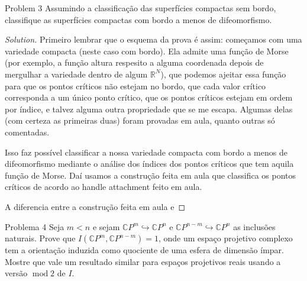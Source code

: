 \iffalse\begin{proof}[Solution]\leavevmode
	Considere a carta \(\varphi_0:\{z_0=1\}\subset\mathbb{C}P^{1}\to \mathbb{C}\), \([1:z]\mapsto z\). Obtemos
\begin{align*}
\frac{\partial }{\partial z}(f \circ \varphi_0^{-1})&=\frac{(1+|z|^2)^m \frac{\partial |1+z^m|^2}{\partial z}-m(1+|z|^2)^{m-1}\cdot \bar{z}\cdot |1+z^m|^2}{(1+|z|^2)^{2m}}.
\end{align*}
Calculamos com calma
\[\frac{\partial |1+z^m|^2}{\partial z}=\frac{\partial }{\partial z}(1+z^m)\overline{(1+z^m)}=(1+z^m)\cdot 0+mz^{m-1}\overline{(1+z^m)}\]
E sustituimos:
\begin{align*}
\frac{\partial }{\partial z}(f \circ \varphi_0^{-1})&=\frac{(1+|z|^2)^m \cdot mz^{m-1}\overline{(1+z^m)}-m(1+|z|^2)^{m-1}\cdot \bar{z}\cdot |1+z^m|^2}{(1+|z|^2)^{2m}}.
\end{align*}
\end{proof}\fi

\begin{thing1}{Problem 3}\label{prob:3}\leavevmode
Assumindo a classificação das superfícies compactas sem bordo, classifique as superfícies compactas com bordo a menos de difeomorfismo.
\end{thing1}

\begin{proof}[Solution]\leavevmode
Primeiro lembrar que o esquema da prova é assim: começamos com uma variedade compacta (neste caso com bordo). Ela admite uma função de Morse (por exemplo, a função altura respesito a alguma coordenada depois de mergulhar a variedade dentro de algum \(\mathbb{R}^N\)), que podemos ajeitar essa função para que os pontos críticos não estejam no bordo, que cada valor crítico corresponda a um único ponto crítico, que os pontos críticos estejam em ordem por índice, e talvez alguma outra propriedade que se me escapa. Algumas delas (com certeza as primeiras duas) foram provadas em aula, quanto outras só comentadas.

Isso faz possível classificar a nossa variedade compacta com bordo a menos de difeomorfismo mediante o análise dos índices dos pontos críticos que tem aquila função de Morse. Daí usamos a construção feita em aula que classifica os pontos críticos de acordo ao handle attachment feito em aula.

A diferencia entre a construção feita em aula e 
\end{proof}

\begin{thing1}{Problema 4}\label{prob:a 4}\leavevmode
Seja \(m<n\) e sejam \(\mathbb{C}P^{m}\hookrightarrow \mathbb{C}P^{n}\) e \(\mathbb{C}P^{n-m}\hookrightarrow \mathbb{C}P^{n}\) as inclusões naturais. Prove que \(I(\mathbb{C}P^{m},\mathbb{C}P^{n-m})=1\), onde um espaço projetivo complexo tem a orientação induzida como quociente de uma esfera de dimensão ímpar. Mostre que vale um resultado similar para espaços projetivos reais usando a versão \(\operatorname{mod}2\) de \(I\).
\end{thing1}

